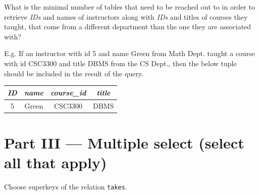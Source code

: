 \documentclass[12pt]{exam}
\begin{document}
\begin{questions}

\begin{minipage}{\linewidth}
\question[3]
What is the minimal number of tables that need to be reached out to in order to retrieve \textit{IDs} and names of instructors along with \textit{IDs} and titles of courses they taught, that come from a different department than the one they are associated with?

E.g. If an instructor with id 5 and name Green from Math Dept. taught a course with id CSC3300 and title DBMS from the CS Dept., then the below tuple should be included in the result of the query.

\begin{center}
\begin{tabular}{|c|c|c|c|}
\hline
\textit{ID} & \textit{name} & \textit{course\_id} & \textit{title} \\
\hline
5 & Green & CSC3300 & DBMS \\
\hline
\end{tabular}
\end{center}

\begin{checkboxes}
\end{checkboxes}

\end{minipage}\vspace{1em}

\section*{Part III — Multiple select (select all that apply)}

\begin{minipage}{\linewidth}
\question[4] Choose superkeys of the relation \texttt{takes}.\par\vspace{0.5em}


\end{minipage}
\end{questions}
\end{document}
